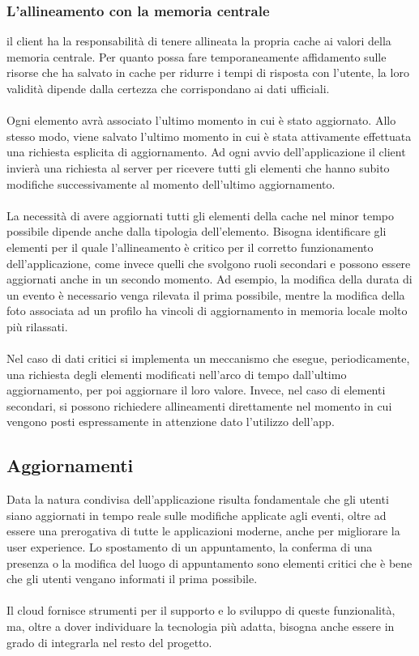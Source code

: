 \subsubsection{ L'allineamento con la memoria centrale}

il client ha la responsabilità di tenere allineata la propria cache ai valori della memoria centrale. 
Per quanto possa fare temporaneamente affidamento sulle risorse che ha salvato in cache per ridurre i tempi di risposta con l’utente, 
la loro validità dipende dalla certezza che corrispondano ai dati ufficiali. \\
\\

Ogni elemento avrà associato l’ultimo momento in cui è stato aggiornato. 
Allo stesso modo, viene salvato l’ultimo momento in cui è stata attivamente effettuata una richiesta esplicita di aggiornamento.  
Ad ogni avvio dell’applicazione il client invierà una richiesta al server per ricevere tutti gli elementi che hanno subito modifiche successivamente al momento dell’ultimo aggiornamento.\\
\\
La necessità di avere aggiornati tutti gli elementi della cache nel minor tempo possibile dipende anche dalla tipologia dell’elemento. 
Bisogna identificare gli elementi per il quale l’allineamento è critico per il corretto funzionamento dell’applicazione, 
come invece quelli che svolgono ruoli secondari e possono essere aggiornati anche in un secondo momento. 
Ad esempio, la modifica della durata di un evento è necessario venga rilevata il prima possibile, 
mentre la modifica della foto associata ad un profilo ha vincoli di aggiornamento in memoria locale molto più rilassati.\\
\\
Nel caso di dati critici si implementa un meccanismo che esegue, periodicamente, una richiesta degli elementi modificati nell’arco di tempo dall’ultimo aggiornamento, 
per poi aggiornare il loro valore. Invece, nel caso di elementi secondari, 
si possono richiedere allineamenti direttamente nel momento in cui vengono posti espressamente in attenzione dato l’utilizzo dell’app.

\clearpage
\subsection{Aggiornamenti}

Data la natura condivisa dell’applicazione risulta fondamentale che gli utenti siano aggiornati in tempo reale sulle modifiche applicate agli eventi, 
oltre ad essere una prerogativa di tutte le applicazioni moderne, anche per migliorare la user experience. 
Lo spostamento di un appuntamento, la conferma di una presenza o la modifica del luogo di appuntamento sono elementi critici che è bene che gli utenti vengano informati il prima possibile. \\
\\
Il cloud fornisce strumenti per il supporto e lo sviluppo di queste funzionalità, ma, oltre a dover individuare la tecnologia più adatta, bisogna anche essere in grado di integrarla nel resto del progetto.\\
\\
